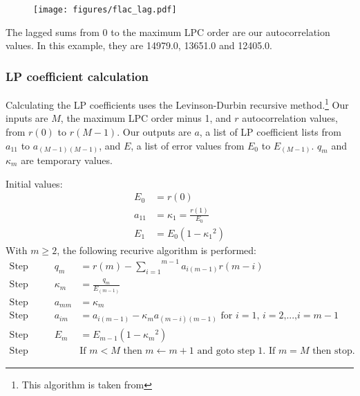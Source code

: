 \begin{figure}[h]
\texttt{[image: figures/flac\_lag.pdf]}
\end{figure}

The lagged sums from 0 to the maximum LPC order are our autocorrelation
values.  In this example, they are 14979.0, 13651.0 and 12405.0.

\subsubsection{LP coefficient calculation}

Calculating the LP coefficients uses the Levinson-Durbin recursive method.\footnote{This algorithm is taken from  }
Our inputs are $M$, the maximum LPC order minus 1, and $r$ autocorrelation
values, from $r(0)$ to $r(M - 1)$.
Our outputs are $a$, a list of LP coefficient lists from
$a_{11}$ to $a_{(M - 1)(M - 1)}$, and $E$, a list
of error values from $E_0$ to $E_{(M - 1)}$.
$q_m$ and $\kappa_m$ are temporary values.
\par
\noindent
Initial values:
\begin{align}
E_0 &= r(0) \\
a_{11} &= \kappa_1 = \frac{r(1)}{E_0} \\
E_1 &= E_0 {(1 - {{\kappa_1} ^ 2})}
\end{align}
\noindent
With $m \geq 2$, the following recurive algorithm is performed:
\begin{align}
\text{Step 1. } && q_m &= r(m) - \overset{m - 1}{\underset{i = 1}{\sum}} a_{i(m - 1)}r(m - i) \\
\text{Step 2. } && \kappa_m &= \frac{q_m}{E_{(m - 1)}} \\
\text{Step 3. } && a_{mm} &= \kappa_m \\
\text{Step 4. } && a_{im} &= a_{i(m - 1)} - \kappa_m a_{(m - i)(m - 1)} \text{ for $i = 1$, $i = 2$,...,$i = m - 1$} \\
\text{Step 5. } && E_m &= E_{m - 1}(1 - {\kappa_m} ^ 2) \\
\text{Step 6. } &&& \text{If $m < M$ then $m \leftarrow m + 1$ and goto step 1.  If $m = M$ then stop.}
\end{align}


